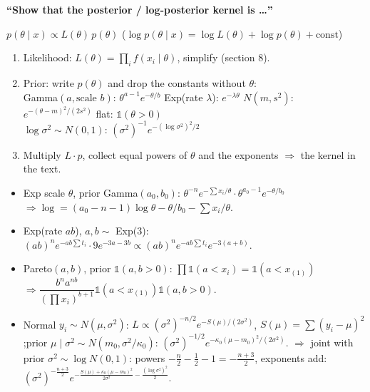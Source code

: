 \documentclass[10pt]{article}
\newcommand{\Q}[1]{\textbf{``#1''}}
\newcommand{\one}{\mathbb{1}}
\newenvironment{answer}[1][Answer to write]{\par\vspace{2pt}\begin{shaded}\small\textbf{#1}\par\vspace{1pt}}{\end{shaded}\vspace{-2pt}}
\begin{document}
\begin{answer}[\Q{Show that the posterior / log-posterior kernel is \dots}]
$p(\theta\mid x)\propto L(\theta)\,p(\theta)$ \qquad ($\log p(\theta\mid x)=\log L(\theta)+\log p(\theta)+\text{const}$)
\begin{enumerate}
\item Likelihood: $L(\theta)=\prod_i f(x_i\mid\theta)$, simplify (section 8).
\item Prior: write $p(\theta)$ and drop the constants without $\theta$:\\
Gamma$(a,\text{scale }b)$: $\theta^{a-1}e^{-\theta/b}$ \quad Exp(rate $\lambda$): $e^{-\lambda\theta}$ \quad $N(m,s^2)$: $e^{-(\theta-m)^2/(2s^2)}$ \quad flat: $\one(\theta>0)$\\
$\log\sigma^2\sim N(0,1)$: $(\sigma^2)^{-1}e^{-(\log\sigma^2)^2/2}$
\item Multiply $L\cdot p$, collect equal powers of $\theta$ and the exponents $\Rightarrow$ the kernel in the text.
\end{enumerate}
\end{answer}
\begin{itemize}
\item Exp scale $\theta$, prior Gamma$(a_0,b_0)$: $\theta^{-n}e^{-\sum x_i/\theta}\cdot\theta^{a_0-1}e^{-\theta/b_0}$ $\Rightarrow \log=(a_0-n-1)\log\theta-\theta/b_0-\sum x_i/\theta$.
\item Exp(rate $ab$), $a,b\sim$ Exp(3): $(ab)^ne^{-ab\sum t_i}\cdot9e^{-3a-3b}\propto(ab)^ne^{-ab\sum t_i}e^{-3(a+b)}$.
\item Pareto$(a,b)$, prior $\one(a,b>0)$: $\prod\one(a<x_i)=\one(a<x_{(1)})$ $\Rightarrow \dfrac{b^na^{nb}}{(\prod x_i)^{b+1}}\one(a<x_{(1)})\one(a,b>0)$.
\item Normal $y_i\sim N(\mu,\sigma^2)$: $L\propto(\sigma^2)^{-n/2}e^{-S(\mu)/(2\sigma^2)}$, $S(\mu)=\sum(y_i-\mu)^2$;\newline prior $\mu\mid\sigma^2\sim N(m_0,\sigma^2/\kappa_0)$: $(\sigma^2)^{-1/2}e^{-\kappa_0(\mu-m_0)^2/(2\sigma^2)}$.
\newline $\Rightarrow$ joint with prior $\sigma^2\sim\log N(0,1)$: powers $-\tfrac n2-\tfrac12-1=-\tfrac{n+3}2$, exponents add: $(\sigma^2)^{-\frac{n+3}2}e^{-\frac{S(\mu)+\kappa_0(\mu-m_0)^2}{2\sigma^2}-\frac{(\log\sigma^2)^2}2}$.
\end{itemize}
\end{document}
